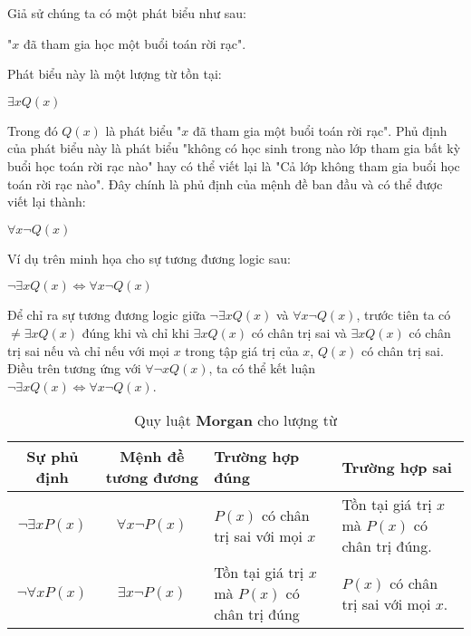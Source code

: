 \documentclass{standalone} %
\begin{document}
        Giả sử chúng ta có một phát biểu như sau:
        \begin{center}
            "$x$ đã tham gia học một buổi toán rời rạc".
        \end{center}
        Phát biểu này là một lượng từ tồn tại:
        \begin{cen}
            $\exists x Q(x)$
        \end{cen}
        Trong đó $Q(x)$ là phát biểu "$x$ đã tham gia một buổi toán rời rạc". Phủ định của phát biểu này là phát biểu "không có học sinh trong nào lớp tham gia bất kỳ buổi học toán rời rạc nào" hay có thể viết lại là "Cả lớp không tham gia buổi học toán rời rạc nào". Đây chính là phủ định của mệnh đề ban đầu và có thể được viết lại thành:
        \begin{center}
            $\forall x \neg Q(x)$
        \end{center}
        Ví dụ trên minh họa cho sự tương đương logic sau:
        \begin{theorem}
            \begin{center}
                $\neg \exists x Q(x) \Leftrightarrow \forall x \neg Q(x)$
            \end{center}
        \end{theorem}
        
        Để chỉ ra sự tương đương logic giữa $\neg \exists x Q(x)$ và $\forall x \neg Q(x)$, trước tiên ta có $\neq \exists x Q(x)$ đúng khi và chỉ khi $\exists x Q(x)$ có chân trị sai và $\exists x Q(x)$ có chân trị sai nếu và chỉ nếu với mọi $x$ trong tập giá trị của $x$, $Q(x)$ có chân trị sai. Điều trên tương ứng với $\forall \neg x Q(x)$, ta có thể kết luận $\neg \exists x Q(x) \Leftrightarrow \forall x \neg Q(x)$.
        
        \begin{table}[h!]
            \centering
            \setlength{\tabcolsep}{12pt}
            \begin{tabular}{c| c| l| l}
                Sự phủ định & Mệnh đề tương đương & Trường hợp đúng & Trường hợp sai\\
                \hline
                $\neg \exists x P(x)$ & $\forall x \neg P(x)$ & \makecell[l]{$P(x)$ có chân trị sai\\ với mọi $x$} & \makecell[l]{Tồn tại giá trị $x$ mà\\ $P(x)$ có chân trị đúng}.\\ \hline
                $\neg \forall x P(x)$ & $\exists x \neg P(x)$ & \makecell[l]{Tồn tại giá trị $x$ mà\\ $P(x)$ có chân trị đúng} & \makecell[l]{$P(x)$ có chân trị sai\\ với mọi $x$}.
            \end{tabular}
            \caption{Quy luật \textbf{Morgan} cho lượng từ}
        \end{table}
        
\end{document}
